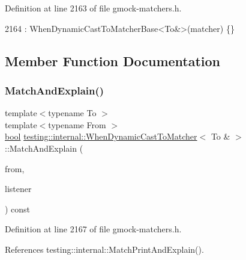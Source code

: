 Definition at line 2163 of file gmock-\/matchers.\+h.


\begin{DoxyCode}
2164       : WhenDynamicCastToMatcherBase<To&>(matcher) \{\}
\end{DoxyCode}


\subsection{Member Function Documentation}
\mbox{\label{classtesting_1_1internal_1_1WhenDynamicCastToMatcher_3_01To_01_6_01_4_a1eb76a60d0943519623f438b29f70a5f}} 
\subsubsection{\texorpdfstring{Match\+And\+Explain()}{MatchAndExplain()}}
{\footnotesize\ttfamily template$<$typename To $>$ \\
template$<$typename From $>$ \\
\hyperlink{classbool}{bool} \hyperlink{classtesting_1_1internal_1_1WhenDynamicCastToMatcher}{testing\+::internal\+::\+When\+Dynamic\+Cast\+To\+Matcher}$<$ To \& $>$\+::Match\+And\+Explain (\begin{DoxyParamCaption}\item[{From \&}]{from,  }\item[{\hyperlink{classtesting_1_1MatchResultListener}{Match\+Result\+Listener} $\ast$}]{listener }\end{DoxyParamCaption}) const\hspace{0.3cm}{\ttfamily [inline]}}



Definition at line 2167 of file gmock-\/matchers.\+h.



References testing\+::internal\+::\+Match\+Print\+And\+Explain().


